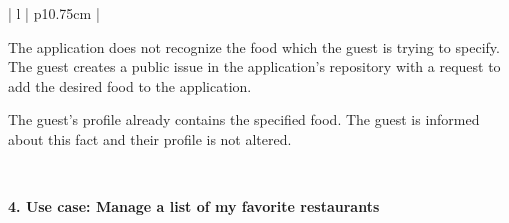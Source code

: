 \begin{center}
\begin{tabular}{| l | p{10.75cm} | }
\begin{minipage}[t]{\linewidth}
\begin{description}[nosep,after=\strut]
        \item [A3:] The application does not recognize the food which the guest is trying to specify. The guest creates a public issue in the application's repository with a request to add the desired food to the application.
        \item [A4:] The guest's profile already contains the specified food. The guest is informed about this fact and their profile is not altered.
      \end{description}
    \end{minipage}
    \\
    \hline
  \end{tabular}
  \newline
\end{center}

\newpage

\noindent \textbf{4. Use case: Manage a list of my favorite restaurants}


